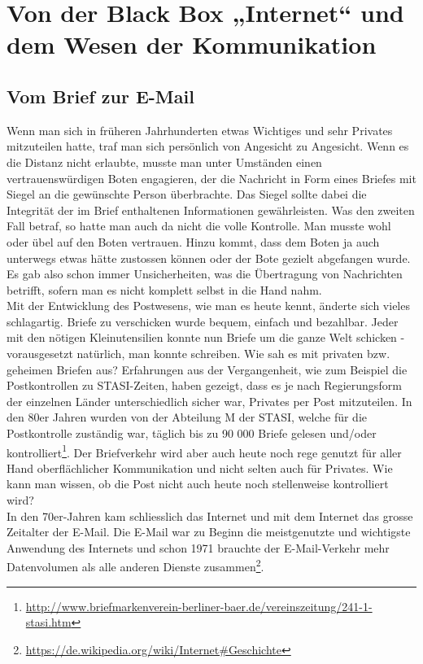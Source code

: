 \newpage
\section{Von der Black Box „Internet“ und dem Wesen der Kommunikation}

\subsection{Vom Brief zur E-Mail}
Wenn man sich in früheren Jahrhunderten etwas Wichtiges und sehr Privates mitzuteilen hatte, traf man sich persönlich von Angesicht zu Angesicht. Wenn es die Distanz nicht erlaubte, musste man unter Umständen einen vertrauenswürdigen Boten engagieren, der die Nachricht in Form eines Briefes mit Siegel an die gewünschte Person überbrachte. Das Siegel sollte dabei die Integrität der im Brief enthaltenen Informationen gewährleisten. Was den zweiten Fall betraf, so hatte man auch da nicht die volle Kontrolle. Man musste wohl oder übel auf den Boten vertrauen. Hinzu kommt, dass dem Boten ja auch unterwegs etwas hätte zustossen können oder der Bote gezielt abgefangen wurde. Es gab also schon immer Unsicherheiten, was die Übertragung von Nachrichten betrifft, sofern man es nicht komplett selbst in die Hand nahm.
\\
Mit der Entwicklung des Postwesens, wie man es heute kennt, änderte sich vieles schlagartig. Briefe zu verschicken wurde bequem, einfach und bezahlbar. Jeder mit den nötigen Kleinutensilien konnte nun Briefe um die ganze Welt schicken - vorausgesetzt natürlich, man konnte schreiben. Wie sah es mit privaten bzw. geheimen Briefen aus? Erfahrungen aus der Vergangenheit, wie zum Beispiel die Postkontrollen zu STASI-Zeiten, haben gezeigt, dass es je nach Regierungsform der einzelnen Länder unterschiedlich sicher war, Privates per Post mitzuteilen. In den 80er Jahren wurden von der Abteilung M der STASI, welche für die Postkontrolle zuständig war, täglich bis zu 90 000 Briefe gelesen und/oder kontrolliert\footnote{\url{http://www.briefmarkenverein-berliner-baer.de/vereinszeitung/241-1-stasi.htm}}.
Der Briefverkehr wird aber auch heute noch rege genutzt für aller Hand oberflächlicher Kommunikation und nicht selten auch für Privates. Wie kann man wissen, ob die Post nicht auch heute noch stellenweise kontrolliert wird?
\\
In den 70er-Jahren kam schliesslich das Internet und mit dem Internet das grosse Zeitalter der E-Mail. Die E-Mail war zu Beginn die meistgenutzte und wichtigste Anwendung des Internets und schon 1971 brauchte der E-Mail-Verkehr mehr Datenvolumen als alle anderen Dienste zusammen\footnote{\url{https://de.wikipedia.org/wiki/Internet\#Geschichte}}.
